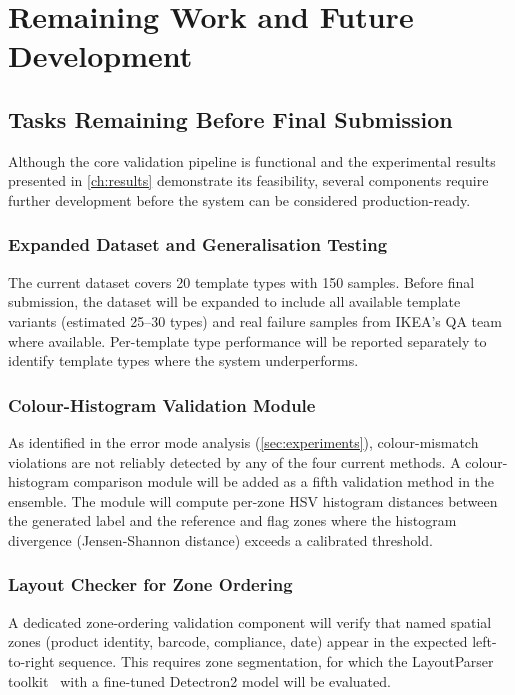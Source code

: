 \chapter{Remaining Work and Future Development}
\label{ch:future}

\section{Tasks Remaining Before Final Submission}

Although the core validation pipeline is functional and the experimental results presented
in \cref{ch:results} demonstrate its feasibility, several components require further
development before the system can be considered production-ready.

\subsection{Expanded Dataset and Generalisation Testing}

The current dataset covers 20 template types with 150 samples. Before final submission,
the dataset will be expanded to include all available template variants (estimated
25–30 types) and real failure samples from IKEA's QA team where available. Per-template
type performance will be reported separately to identify template types where the system
underperforms.

\subsection{Colour-Histogram Validation Module}

As identified in the error mode analysis (\cref{sec:experiments}), colour-mismatch
violations are not reliably detected by any of the four current methods. A
colour-histogram comparison module will be added as a fifth validation method in the
ensemble. The module will compute per-zone HSV histogram distances between the generated
label and the reference and flag zones where the histogram divergence (Jensen-Shannon
distance) exceeds a calibrated threshold.

\subsection{Layout Checker for Zone Ordering}

A dedicated zone-ordering validation component will verify that named spatial zones
(product identity, barcode, compliance, date) appear in the expected left-to-right
sequence. This requires zone segmentation, for which the LayoutParser toolkit~\cite{shen2021layoutparser}
with a fine-tuned Detectron2 model will be evaluated.

